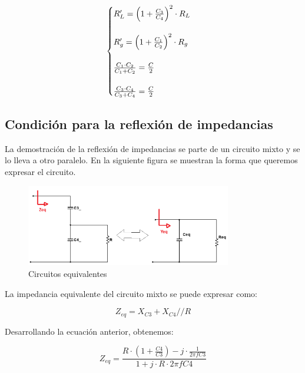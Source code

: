 \begin{equation}
    \begin{cases}
        R_L' = \left(1 + \frac{C_3}{C_4}\right)^2 \cdot R_L \vphantom{\frac{C_1 \cdot C_2}{C_1 + C_2}} \\
        \\
        R_g' = \left(1 + \frac{C_1}{C_2}\right)^2 \cdot R_g \vphantom{\frac{C_1 \cdot C_2}{C_1 + C_2}} \\
        \\
        \frac{C_1 \cdot C_2}{C_1 + C_2} = \frac{C}{2} \\
        \\
        \frac{C_3 \cdot C_4}{C_3 + C_4} = \frac{C}{2}
    \end{cases}
\end{equation}

\subsection{Condición para la reflexión de impedancias}

La demostración de la reflexión de impedancias se parte de un circuito mixto y se lo lleva a otro paralelo. En la siguiente figura se muestran la forma que queremos expresar el circuito.

\begin{figure}[h]
    \centering
    \includegraphics[width=0.8\textwidth]{Imagenes/reflexion_impedancias.png}
    \caption{Circuitos equivalentes}
\end{figure}

La impedancia equivalente del circuito mixto se puede expresar como:

\begin{equation}
    Z_{eq} = X_{C3} + X_{C4} // R 
\end{equation}

Desarrollando la ecuación anterior, obtenemos:

\begin{equation}
    Z_{eq} = \frac{R \cdot (1 + \frac{C4}{C3}) - j \cdot \frac{1}{2 \pi f C3}}{1 + j \cdot R \cdot 2 \pi f C4} 
\end{equation}

